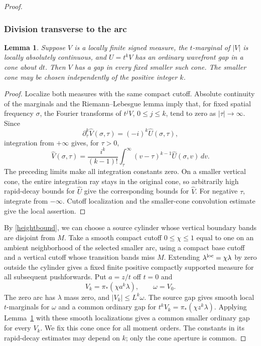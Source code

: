 \documentclass[11pt]{article}
\newtheorem{lemma}[theorem]{Lemma}
\begin{document}
\begin{proof}
\subsubsection{Division transverse to the arc}
\begin{lemma}\label{lem:division}
Suppose $V$ is a locally finite signed measure, the $t$-marginal of $|V|$ is locally absolutely continuous, and $U=t^kV$ has an ordinary wavefront gap in a cone about $dt$. Then $V$ has a gap in every fixed smaller such cone. The smaller cone may be chosen independently of the positive integer $k$.
\end{lemma}
\begin{proof}
Localize both measures with the same compact cutoff. Absolute continuity of the marginals and the Riemann--Lebesgue lemma imply that, for fixed spatial frequency $\sigma$, the Fourier transforms of $t^jV$, $0\le j\le k$, tend to zero as $|\tau|\to\infty$. Since
\[
 \partial_\tau^k\widehat V(\sigma,\tau)=(-i)^k\widehat U(\sigma,\tau),
\]
integration from $+\infty$ gives, for $\tau>0$,
\[
 \widehat V(\sigma,\tau)
 =\frac{i^k}{(k-1)!}\int_\tau^\infty
 (v-\tau)^{k-1}\widehat U(\sigma,v)\,dv.
\]
The preceding limits make all integration constants zero. On a smaller vertical cone, the entire integration ray stays in the original cone, so arbitrarily high rapid-decay bounds for $\widehat U$ give the corresponding bounds for $\widehat V$. For negative $\tau$, integrate from $-\infty$. Cutoff localization and the smaller-cone convolution estimate give the local assertion.
\end{proof}

By \eqref{heightbound}, we can choose a source cylinder whose vertical boundary bands are disjoint from $M$. Take a smooth compact cutoff $0\le\chi\le1$ equal to one on an ambient neighborhood of the selected smaller arc, using a compact base cutoff and a vertical cutoff whose transition bands miss $M$. Extending $\lambda^{\rm loc}=\chi\lambda$ by zero outside the cylinder gives a fixed finite positive compactly supported measure for all subsequent pushforwards. Put $a=z/t$ off $t=0$ and
\[
 V_k=\pi_*(\chi a^k\lambda),\qquad \omega=V_0.
\]
The zero arc has $\lambda$ mass zero, and $|V_k|\le L^k\omega$. The source gap gives smooth local $t$-marginals for $\omega$ and a common ordinary gap for
$t^kV_k=\pi_*(\chi z^k\lambda)$. Applying Lemma~\ref{lem:division} with these smooth localizations gives a common smaller ordinary gap for every $V_k$. We fix this cone once for all moment orders. The constants in its rapid-decay estimates may depend on $k$; only the cone aperture is common.


\end{proof}
\end{document}
